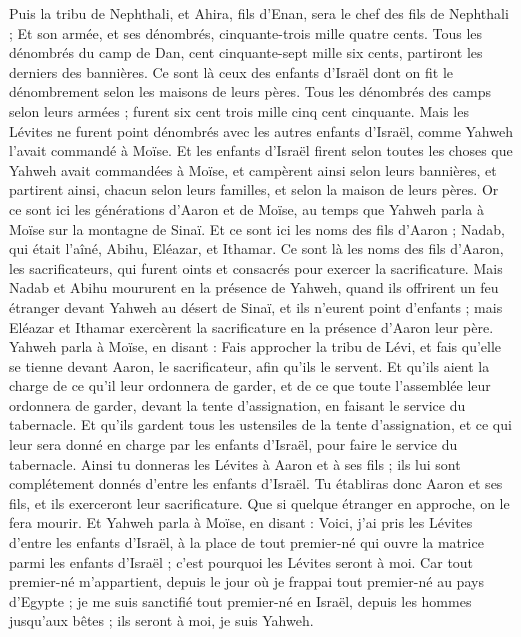 \begin{multicols}{2}
Puis la tribu de Nephthali, et Ahira, fils d'Enan, sera le chef des fils de Nephthali ;
Et son armée, et ses dénombrés, cinquante-trois mille quatre cents.
Tous les dénombrés du camp de Dan, cent cinquante-sept mille six cents, partiront les derniers des bannières.
Ce sont là ceux des enfants d'Israël dont on fit le dénombrement selon les maisons de leurs pères. Tous les dénombrés des camps selon leurs armées ; furent six cent trois mille cinq cent cinquante.
Mais les Lévites ne furent point dénombrés avec les autres enfants d'Israël, comme Yahweh l'avait commandé à Moïse.
Et les enfants d'Israël firent selon toutes les choses que Yahweh avait commandées à Moïse, et campèrent ainsi selon leurs bannières, et partirent ainsi, chacun selon leurs familles, et selon la maison de leurs pères.
\VerseOne{}Or ce sont ici les générations d'Aaron et de Moïse, au temps que Yahweh parla à Moïse sur la montagne de Sinaï.
Et ce sont ici les noms des fils d'Aaron ; Nadab, qui était l'aîné, Abihu, Eléazar, et Ithamar.
Ce sont là les noms des fils d'Aaron, les sacrificateurs, qui furent oints et consacrés pour exercer la sacrificature.
Mais Nadab et Abihu moururent en la présence de Yahweh, quand ils offrirent un feu étranger devant Yahweh au désert de Sinaï, et ils n'eurent point d'enfants ; mais Eléazar et Ithamar exercèrent la sacrificature en la présence d'Aaron leur père.
Yahweh parla à Moïse, en disant :
Fais approcher la tribu de Lévi, et fais qu'elle se tienne devant Aaron, le sacrificateur, afin qu'ils le servent.
Et qu'ils aient la charge de ce qu'il leur ordonnera de garder, et de ce que toute l'assemblée leur ordonnera de garder, devant la tente d'assignation, en faisant le service du tabernacle.
Et qu'ils gardent tous les ustensiles de la tente d'assignation, et ce qui leur sera donné en charge par les enfants d'Israël, pour faire le service du tabernacle.
Ainsi tu donneras les Lévites à Aaron et à ses fils ; ils lui sont complétement donnés d'entre les enfants d'Israël.
Tu établiras donc Aaron et ses fils, et ils exerceront leur sacrificature. Que si quelque étranger en approche, on le fera mourir.
Et Yahweh parla à Moïse, en disant :
Voici, j'ai pris les Lévites d'entre les enfants d'Israël, à la place de tout premier-né qui ouvre la matrice parmi les enfants d'Israël ; c'est pourquoi les Lévites seront à moi.
Car tout premier-né m'appartient, depuis le jour où je frappai tout premier-né au pays d'Egypte ; je me suis sanctifié tout premier-né en Israël, depuis les hommes jusqu'aux bêtes ; ils seront à moi, je suis Yahweh.

\end{multicols}
